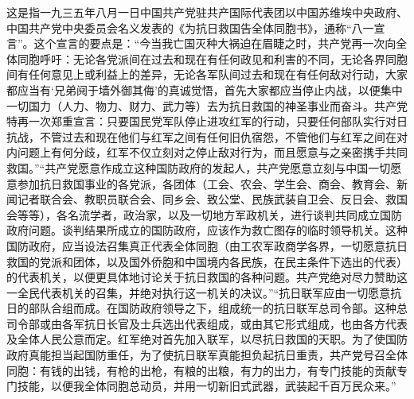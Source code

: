 \begin{maonote}
这是指一九三五年八月一日中国共产党驻共产国际代表团以中国苏维埃中央政府、中国共产党中央委员会名义发表的《为抗日救国告全体同胞书》，通称“八一宣言”。这个宣言的要点是：“今当我亡国灭种大祸迫在眉睫之时，共产党再一次向全体同胞呼吁：无论各党派间在过去和现在有任何政见和利害的不同，无论各界同胞间有任何意见上或利益上的差异，无论各军队间过去和现在有任何敌对行动，大家都应当有‘兄弟阋于墙外御其侮’的真诚觉悟，首先大家都应当停止内战，以便集中一切国力（人力、物力、财力、武力等）去为抗日救国的神圣事业而奋斗。共产党特再一次郑重宣言：只要国民党军队停止进攻红军的行动，只要任何部队实行对日抗战，不管过去和现在他们与红军之间有任何旧仇宿怨，不管他们与红军之间在对内问题上有何分歧，红军不仅立刻对之停止敌对行为，而且愿意与之亲密携手共同救国。”“共产党愿意作成立这种国防政府的发起人，共产党愿意立刻与中国一切愿意参加抗日救国事业的各党派，各团体（工会、农会、学生会、商会、教育会、新闻记者联合会、教职员联合会、同乡会、致公堂、民族武装自卫会、反日会、救国会等等），各名流学者，政治家，以及一切地方军政机关，进行谈判共同成立国防政府问题。谈判结果所成立的国防政府，应该作为救亡图存的临时领导机关。这种国防政府，应当设法召集真正代表全体同胞（由工农军政商学各界，一切愿意抗日救国的党派和团体，以及国外侨胞和中国境内各民族，在民主条件下选出的代表）的代表机关，以便更具体地讨论关于抗日救国的各种问题。共产党绝对尽力赞助这一全民代表机关的召集，并绝对执行这一机关的决议。”“抗日联军应由一切愿意抗日的部队合组而成。在国防政府领导之下，组成统一的抗日联军总司令部。这种总司令部或由各军抗日长官及士兵选出代表组成，或由其它形式组成，也由各方代表及全体人民公意而定。红军绝对首先加入联军，以尽抗日救国的天职。为了使国防政府真能担当起国防重任，为了使抗日联军真能担负起抗日重责，共产党号召全体同胞：有钱的出钱，有枪的出枪，有粮的出粮，有力的出力，有专门技能的贡献专门技能，以便我全体同胞总动员，并用一切新旧式武器，武装起千百万民众来。”

\end{maonote}
